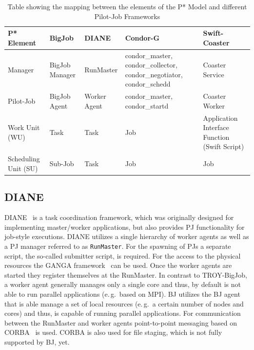 \documentclass[conference,final]{IEEEtran}
\newcommand{\up}{\vspace*{-1em}}
\newcommand{\upp}{\vspace*{-0.5em}}
\begin{document}
\begin{table}[t]
\centering
\begin{tabular}{|p{2.5cm}|p{3cm}|p{3cm}|p{3cm}|p{3cm}|}
  \hline
  \textbf{P* Element} &\textbf{BigJob} &\textbf{DIANE} &\textbf{Condor-G} &\textbf{Swift-Coaster}  \\
  \hline
  Manager &BigJob Manager & RunMaster & condor\_master, condor\_collector, condor\_negotiator, condor\_schedd &Coaster Service\\ 
  \hline
  Pilot-Job &BigJob Agent  & Worker Agent &condor\_master, condor\_startd &Coaster Worker\\
  \hline
  Work Unit (WU) &Task &Task &Job &Application Interface Function (Swift Script)\\
  \hline
  Scheduling Unit (SU) &Sub-Job &Task &Job &Job\\
\hline
\end{tabular}
\caption{Table showing the mapping between the elements of the P* Model and different Pilot-Job Frameworks\up} \label{table:bigjob-saga-diane}
\end{table}

\upp
\subsection{DIANE\upp\upp}

DIANE~\cite{Moscicki:908910} is a task coordination framework, which was
originally designed for implementing master/worker applications, but also
provides PJ functionality for job-style executions. DIANE utilizes a single
hierarchy of worker agents as well as a PJ manager referred to as
\texttt{RunMaster}.
For the spawning of PJs a separate script, the so-called submitter script, is
required. For the access to the physical resources the GANGA
framework~\cite{DBLP:journals/corr/abs-0902-2685} can be used.
Once the worker agents are started they register themselves at the RunMaster.
In contrast to TROY-BigJob, a worker agent generally manages only a single
core and thus, by default is not able to run parallel applications (e.\,g.\
based on MPI). BJ utilizes the BJ agent that is able manage a set of local
resources (e.\,g.\ a certain number of nodes and cores) and thus, is capable
of running parallel applications. For communication between the RunMaster and
worker agents point-to-point messaging based on CORBA~\cite{OMG-CORBA303:2004}
is used. CORBA is also used for file staging, which is not fully supported by
BJ, yet.
\end{document}
